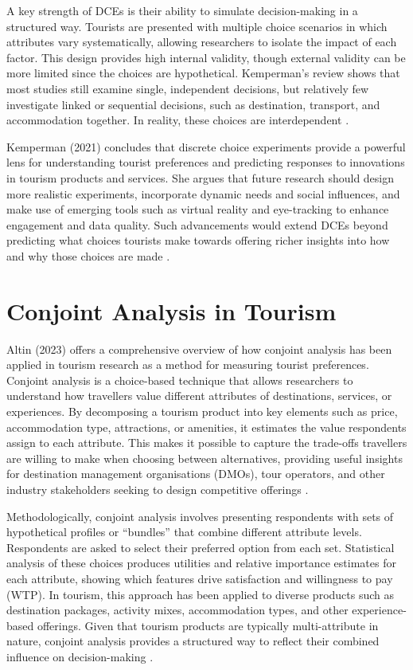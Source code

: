 \documentclass[a4paper, 12pt, twoside]{report}  %
\begin{document}
\indent A key strength of DCEs is their ability to simulate decision-making in a structured way. Tourists are presented with multiple choice scenarios in which attributes vary systematically, allowing researchers to isolate the impact of each factor. This design provides high internal validity, though external validity can be more limited since the choices are hypothetical. Kemperman’s review shows that most studies still examine single, independent decisions, but relatively few investigate linked or sequential decisions, such as destination, transport, and accommodation together. In reality, these choices are interdependent \cite{discretechoice}.

\indent Kemperman (2021) concludes that discrete choice experiments provide a powerful lens for understanding tourist preferences and predicting responses to innovations in tourism products and services. She argues that future research should design more realistic experiments, incorporate dynamic needs and social influences, and make use of emerging tools such as virtual reality and eye-tracking to enhance engagement and data quality. Such advancements would extend DCEs beyond predicting what choices tourists make towards offering richer insights into how and why those choices are made \cite{discretechoice}.

\section{Conjoint Analysis in Tourism}

\indent Altin (2023) offers a comprehensive overview of how conjoint analysis has been applied in tourism research as a method for measuring tourist preferences. Conjoint analysis is a choice-based technique that allows researchers to understand how travellers value different attributes of destinations, services, or experiences. By decomposing a tourism product into key elements such as price, accommodation type, attractions, or amenities, it estimates the value respondents assign to each attribute. This makes it possible to capture the trade-offs travellers are willing to make when choosing between alternatives, providing useful insights for destination management organisations (DMOs), tour operators, and other industry stakeholders seeking to design competitive offerings \cite{conjointaltin}.

\indent Methodologically, conjoint analysis involves presenting respondents with sets of hypothetical profiles or “bundles” that combine different attribute levels. Respondents are asked to select their preferred option from each set. Statistical analysis of these choices produces utilities and relative importance estimates for each attribute, showing which features drive satisfaction and willingness to pay (WTP). In tourism, this approach has been applied to diverse products such as destination packages, activity mixes, accommodation types, and other experience-based offerings. Given that tourism products are typically multi-attribute in nature, conjoint analysis provides a structured way to reflect their combined influence on decision-making \cite{conjointaltin}.
\end{document}
